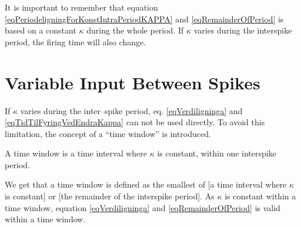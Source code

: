 It is important to remember that equation \eqref{eqPeriodeligningForKonstIntraPeriodKAPPA} and \eqref{eqRemainderOfPeriod} is based on a constant $\kappa$ during the whole period. 
If $\kappa$ varies during the interspike period, the firing time will also change. 




\section{Variable Input Between Spikes}
\label{ssecVariableInputBetweenSpikes}


If $\kappa$ varies during the inter--spike period, eq. \eqref{eqVerdiligninga} and \eqref{eqTidTilFyringVedEndraKappa} can not be used directly.
To avoid this limitation, the concept of a ``time window'' is introduced. 
\begin{mydef}
A time window is a time interval where $\kappa$ is constant, within one interspike period.
\end{mydef}
%
We get that a time window is defined as the smallest of [a time interval where $\kappa$ is constant] or [the remainder of the interspike period].
As $\kappa$ is constant within a time window, equation \eqref{eqVerdiligninga} and \eqref{eqRemainderOfPeriod} is valid within a time window.

